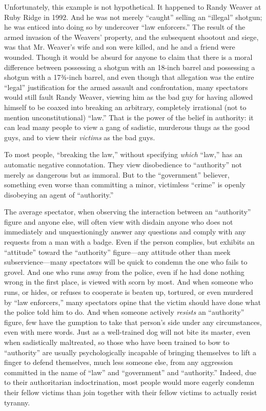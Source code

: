 \documentclass{book}
\begin{document}
Unfortunately, this example is not hypothetical. It happened to Randy Weaver at Ruby Ridge in 1992. And he was not merely \enquote{caught} selling an \enquote{illegal} shotgun; he was enticed into doing so by undercover \enquote{law enforcers.} The result of the armed invasion of the Weavers' property, and the subsequent shootout and siege, was that Mr. Weaver's wife and son were killed, and he and a friend were wounded. Though it would be absurd for anyone to claim that there is a moral difference between possessing a shotgun with an 18-inch barrel and possessing a shotgun with a 17¾-inch barrel, and even though that allegation was the entire \enquote{legal} justification for the armed assault and confrontation, many spectators would still fault Randy Weaver, viewing him as the bad guy for having allowed himself to be coaxed into breaking an arbitrary, completely irrational (not to mention unconstitutional) \enquote{law.} That is the power of the belief in authority: it can lead many people to view a gang of sadistic, murderous thugs as the good guys, and to view their \emph{victims} as the bad guys.

To most people, \enquote{breaking the law,} without specifying \emph{which} \enquote{law,} has an automatic negative connotation. They view disobedience to \enquote{authority} not merely as dangerous but as immoral. But to the \enquote{government} believer, something even worse than committing a minor, victimless \enquote{crime} is openly disobeying an agent of \enquote{authority.}

The average spectator, when observing the interaction between an \enquote{authority} figure and anyone else, will often view with disdain anyone who does not immediately and unquestioningly answer any questions and comply with any requests from a man with a badge. Even if the person complies, but exhibits an \enquote{attitude} toward the \enquote{authority} figure---any attitude other than meek subservience---many spectators will be quick to condemn the one who fails to grovel. And one who runs away from the police, even if he had done nothing wrong in the first place, is viewed with scorn by most. And when someone who runs, or hides, or refuses to cooperate is beaten up, tortured, or even murdered by \enquote{law enforcers,} many spectators opine that the victim should have done what the police told him to do. And when someone actively \emph{resists} an \enquote{authority} figure, few have the gumption to take that person's side under any circumstances, even with mere words. Just as a well-trained dog will not bite its master, even when sadistically maltreated, so those who have been trained to bow to \enquote{authority} are usually psychologically incapable of bringing themselves to lift a finger to defend themselves, much less someone else, from any aggression committed in the name of \enquote{law} and \enquote{government} and \enquote{authority.} Indeed, due to their authoritarian indoctrination, most people would more eagerly condemn their fellow victims than join together with their fellow victims to actually resist tyranny.
\end{document}
